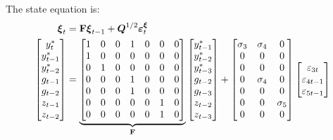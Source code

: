 \documentclass[a4paper,12pt]{article}
\begin{document}
\esq The state equation is:%
\begin{align}
\boldsymbol{\xi }_{t}& =\mathbf{F}\boldsymbol{\xi }_{t-1}+\boldsymbol{Q}%
^{1/2}\boldsymbol{\varepsilon }_{t}^{\boldsymbol{\xi }}  \notag \\
\begin{bmatrix}
y_{t}^{\ast } \\
y_{t-1}^{\ast } \\
y_{t-2}^{\ast } \\
g_{t-1} \\
g_{t-2} \\
z_{t-1} \\
z_{t-2}%
\end{bmatrix}%
& =\underbrace{%
\begin{bmatrix}
1 & 0 & 0 & 1 & 0 & 0 & 0 \\
1 & 0 & 0 & 0 & 0 & 0 & 0 \\
0 & 1 & 0 & 0 & 0 & 0 & 0 \\
0 & 0 & 0 & 1 & 0 & 0 & 0 \\
0 & 0 & 0 & 1 & 0 & 0 & 0 \\
0 & 0 & 0 & 0 & 0 & 1 & 0 \\
0 & 0 & 0 & 0 & 0 & 1 & 0%
\end{bmatrix}%
}_{\mathbf{F}}%
\begin{bmatrix}
y_{t-1}^{\ast } \\
y_{t-2}^{\ast } \\
y_{t-3}^{\ast } \\
g_{t-2} \\
g_{t-3} \\
z_{t-2} \\
z_{t-3}%
\end{bmatrix}%
+%
\begin{bmatrix}
\sigma _{3} & \sigma _{4} & 0 \\
0 & 0 & 0 \\
0 & 0 & 0 \\
0 & \sigma _{4} & 0 \\
0 & 0 & 0 \\
0 & 0 & \sigma _{5} \\
0 & 0 & 0%
\end{bmatrix}%
\begin{bmatrix}
\varepsilon _{3t} \\
\varepsilon _{4t-1} \\
\varepsilon _{5t-1}%
\end{bmatrix}
\label{state1}
\end{align}
\end{document}
